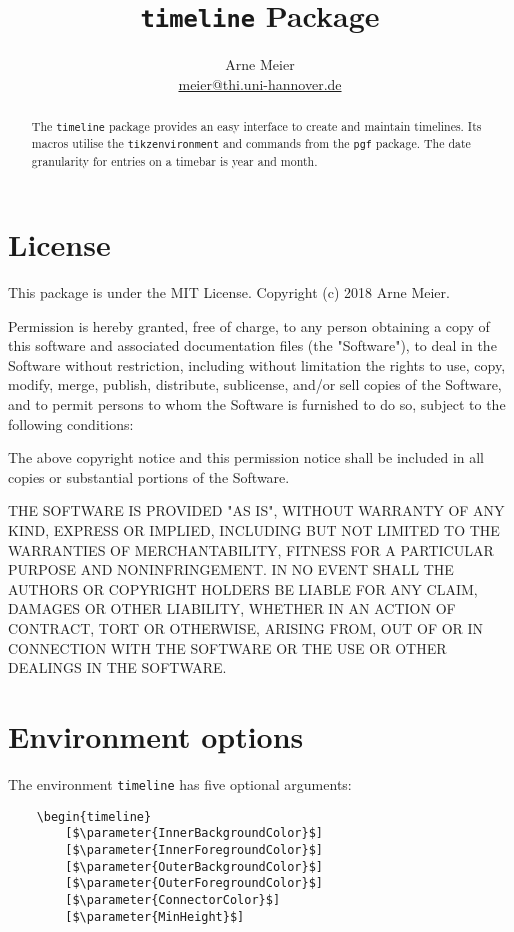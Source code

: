 \documentclass{article}
\author{Arne Meier\\\url{meier@thi.uni-hannover.de}}
\title{\texttt{timeline} Package}
\newcommand{\parameter}[1]{\langle\normalfont\textit{#1}\rangle}
\begin{document}
\maketitle
\begin{abstract}
	The \texttt{timeline} package provides an easy interface to create and maintain timelines.
	Its macros utilise the \texttt{tikzenvironment} and commands from the  \texttt{pgf} package.
	The date granularity for entries on a timebar is year and month.
\end{abstract}

\section{License}
This package is under the MIT License. Copyright (c) 2018 Arne Meier.

Permission is hereby granted, free of charge, to any person obtaining a copy
of this software and associated documentation files (the "Software"), to deal
in the Software without restriction, including without limitation the rights
to use, copy, modify, merge, publish, distribute, sublicense, and/or sell
copies of the Software, and to permit persons to whom the Software is
furnished to do so, subject to the following conditions:

The above copyright notice and this permission notice shall be included in all
copies or substantial portions of the Software.

THE SOFTWARE IS PROVIDED "AS IS", WITHOUT WARRANTY OF ANY KIND, EXPRESS OR
IMPLIED, INCLUDING BUT NOT LIMITED TO THE WARRANTIES OF MERCHANTABILITY,
FITNESS FOR A PARTICULAR PURPOSE AND NONINFRINGEMENT. IN NO EVENT SHALL THE
AUTHORS OR COPYRIGHT HOLDERS BE LIABLE FOR ANY CLAIM, DAMAGES OR OTHER
LIABILITY, WHETHER IN AN ACTION OF CONTRACT, TORT OR OTHERWISE, ARISING FROM,
OUT OF OR IN CONNECTION WITH THE SOFTWARE OR THE USE OR OTHER DEALINGS IN THE
SOFTWARE.

\section{Environment options}
The environment \texttt{timeline} has five optional arguments:
\begin{center}
\begin{lstlisting}
	\begin{timeline}
		[$\parameter{InnerBackgroundColor}$]
		[$\parameter{InnerForegroundColor}$]
		[$\parameter{OuterBackgroundColor}$]
		[$\parameter{OuterForegroundColor}$]
		[$\parameter{ConnectorColor}$]
		[$\parameter{MinHeight}$]
\end{lstlisting}
\end{center}
\end{document}
